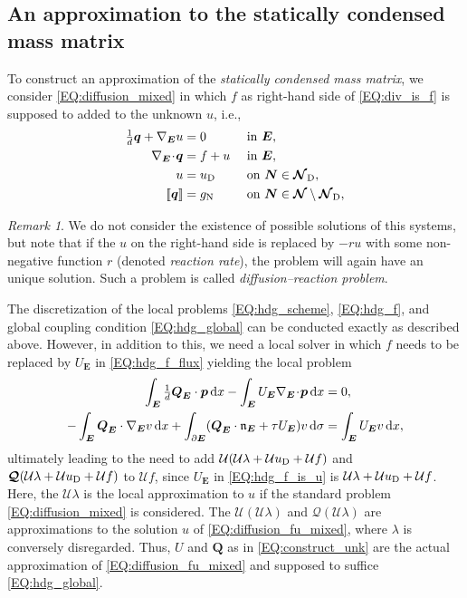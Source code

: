 \documentclass[a4paper, english, 12pt, reqno, draft]{amsart}
\theoremstyle{definition}
\theoremstyle{remark}
\newtheorem{remark}[theorem]{Remark}
\numberwithin{equation}{section}
\newcommand{\SetNode}{\ensuremath{\boldsymbol{\mathcal N}}}
\newcommand{\SetNodeDir}{\ensuremath{\SetNode_\textup D}}
\newcommand{\Edge}{{\ensuremath{\boldsymbol E}}}
\newcommand{\Node}{{\ensuremath{\boldsymbol N}}}
\newcommand{\Nabla}{\ensuremath{\nabla_\Edge}}
\newcommand{\Div}{\ensuremath{\Nabla\!\cdot\!}}
\newcommand{\Normal}{\ensuremath{\mathfrak n_\Edge}}
\newcommand{\jump}[1]{{[\![ #1 ]\!]}}
\renewcommand{\vec}[1]{\ensuremath{\boldsymbol{#1}}}
\newcommand{\dx}{\ensuremath{\, \textup d x}}
\newcommand{\ds}{\ensuremath{\, \textup d \sigma}}
\newcommand{\localU}{\ensuremath{\mathcal U}}
\newcommand{\localQ}{\ensuremath{\vec{\mathcal Q}}}
\begin{document}
\subsection{An approximation to the statically condensed mass matrix}\label{SEC:approx_mass}
% 
To construct an approximation of the \emph{statically condensed mass matrix}, we consider \eqref{EQ:diffusion_mixed} in which $f$ as right-hand side of \eqref{EQ:div_is_f} is supposed to added to the unknown $u$, i.e.,
% 
\begin{subequations}\label{EQ:diffusion_fu_mixed}
\begin{align}
 \tfrac{1}{d} \vec q + \Nabla u & = 0 && \text{ in } \Edge,\label{EQ:primal_dual_fu}\\
 \Div \vec q & = f + u && \text{ in } \Edge,\label{EQ:div_is_u}\\
  u & = u_\textup D && \text{ on } \Node \in \SetNodeDir,\label{EQ:dir_cond_fu}\\
 \jump{\vec q} & = g_\textup N && \text{ on } \Node \in \SetNode \setminus \SetNodeDir,\label{EQ:neu_cond_fu}
\end{align}
\end{subequations}
% 
\begin{remark}\label{REM:ex_reaction}
 We do not consider the existence of possible solutions of this systems, but note that if the $u$ on the right-hand side is replaced by $- ru$ with some non-negative function $r$ (denoted \emph{reaction rate}), the problem will again have an unique solution. Such a problem is called \emph{diffusion--reaction problem}.
\end{remark}
% 
The discretization of the local problems \eqref{EQ:hdg_scheme}, \eqref{EQ:hdg_f}, and global coupling condition \eqref{EQ:hdg_global} can be conducted exactly as described above. However, in addition to this, we need a local solver in which $f$ needs to be replaced by $U_\Edge$ in \eqref{EQ:hdg_f_flux} yielding the local problem
% 
\begin{subequations}\label{EQ:hdg_f_is_u}
 \begin{align}
  \int_\Edge \tfrac{1}{d} \vec Q_\Edge \cdot \vec p \dx - \int_\Edge U_\Edge \Div \vec p \dx & = 0, \label{EQ:hdg_fu_primary}\\
  - \int_\Edge \vec Q_\Edge \cdot \Nabla v \dx  + \int_{\partial \Edge} ( \vec Q_\Edge \cdot \Normal + \tau U_\Edge ) v \ds & =  \int_{\Edge} U_\Edge v \dx,\label{EQ:hdg_fu_flux}
 \end{align}
\end{subequations}
% 
ultimately leading to the need to add $\localU (\localU \lambda + \localU u_\text D + \localU f)$ and $\localQ (\localU \lambda + \localU u_\text D + \localU f)$ to $\localU f$, since $U_\Edge$ in \eqref{EQ:hdg_f_is_u} is $\localU \lambda + \localU u_\text D + \localU f$. Here, the $\localU \lambda$ is the local approximation to $u$ if the standard problem \eqref{EQ:diffusion_mixed} is considered. The $\localU (\localU \lambda)$ and $\localQ (\localU \lambda)$ are approximations to the solution $u$ of \eqref{EQ:diffusion_fu_mixed}, where $\lambda$ is conversely disregarded. Thus, $U$ and $\vec Q$ as in \eqref{EQ:construct_unk} are the actual approximation of \eqref{EQ:diffusion_fu_mixed} and supposed to suffice \eqref{EQ:hdg_global}.
\end{document}
